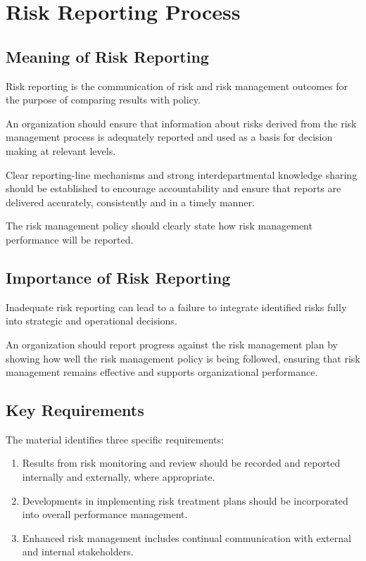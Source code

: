 \documentclass[
]{book}
\providecommand{\tightlist}{%
  \setlength{\itemsep}{0pt}\setlength{\parskip}{0pt}}
\begin{document}
\chapter{Risk Reporting Process}\label{risk-reporting-process}

\section{Meaning of Risk Reporting}\label{meaning-of-risk-reporting}

Risk reporting is the communication of risk and risk management outcomes for the purpose of comparing results with policy.

An organization should ensure that information about risks derived from the risk management process is adequately reported and used as a basis for decision making at relevant levels.

Clear reporting-line mechanisms and strong interdepartmental knowledge sharing should be established to encourage accountability and ensure that reports are delivered accurately, consistently and in a timely manner.

The risk management policy should clearly state how risk management performance will be reported.

\section{Importance of Risk Reporting}\label{importance-of-risk-reporting}

Inadequate risk reporting can lead to a failure to integrate identified risks fully into strategic and operational decisions.

An organization should report progress against the risk management plan by showing how well the risk management policy is being followed, ensuring that risk management remains effective and supports organizational performance.

\section{Key Requirements}\label{key-requirements}

The material identifies three specific requirements:

\begin{enumerate}
\def\labelenumi{\arabic{enumi}.}
\tightlist
\item
  Results from risk monitoring and review should be recorded and reported internally and externally, where appropriate.
\item
  Developments in implementing risk treatment plans should be incorporated into overall performance management.
\item
  Enhanced risk management includes continual communication with external and internal stakeholders.
\end{enumerate}
\end{document}

